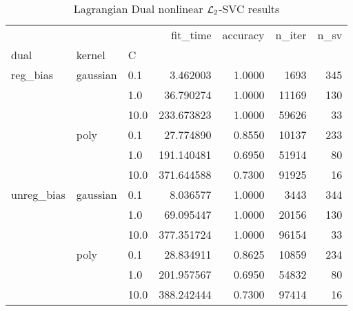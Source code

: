 \begin{table}[H]
\centering
\caption{Lagrangian Dual nonlinear $\protect \mathcal{L}_2$-SVC results}
\label{nonlinear_lagrangian_dual_l2_svc_cv_results}
\begin{tabular}{lllrrrr}
\toprule
           &      &      &    fit\_time &  accuracy &  n\_iter &  n\_sv \\
dual & kernel & C &             &           &         &       \\
\midrule
reg\_bias & gaussian & 0.1  &    3.462003 &    1.0000 &    1693 &   345 \\
           &      & 1.0  &   36.790274 &    1.0000 &   11169 &   130 \\
           &      & 10.0 &  233.673823 &    1.0000 &   59626 &    33 \\
           & poly & 0.1  &   27.774890 &    0.8550 &   10137 &   233 \\
           &      & 1.0  &  191.140481 &    0.6950 &   51914 &    80 \\
           &      & 10.0 &  371.644588 &    0.7300 &   91925 &    16 \\
unreg\_bias & gaussian & 0.1  &    8.036577 &    1.0000 &    3443 &   344 \\
           &      & 1.0  &   69.095447 &    1.0000 &   20156 &   130 \\
           &      & 10.0 &  377.351724 &    1.0000 &   96154 &    33 \\
           & poly & 0.1  &   28.834911 &    0.8625 &   10859 &   234 \\
           &      & 1.0  &  201.957567 &    0.6950 &   54832 &    80 \\
           &      & 10.0 &  388.242444 &    0.7300 &   97414 &    16 \\
\bottomrule
\end{tabular}
\end{table}
